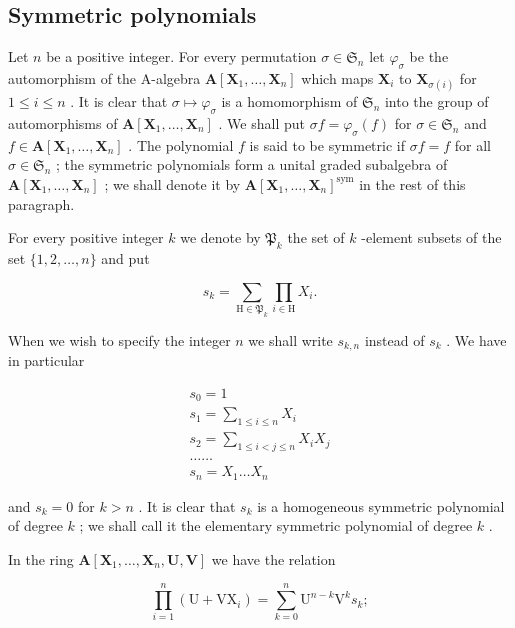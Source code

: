 \subsection{Symmetric polynomials}

Let \(n\) be a positive integer. For every permutation \(\sigma \in \mathfrak{S}_n\) let \(\varphi_{\sigma}\) be the automorphism of the A-algebra \(\mathbf{A}[\mathbf{X}_1, \ldots, \mathbf{X}_n]\) which maps \(\mathbf{X}_i\) to \(\mathbf{X}_{\sigma(i)}\) for \(1 \leqslant i \leqslant n\) . It is clear that \(\sigma \mapsto \varphi_{\sigma}\) is a homomorphism of \(\mathfrak{S}_n\) into the group of automorphisms of \(\mathbf{A}[\mathbf{X}_1, \ldots, \mathbf{X}_n]\) . We shall put \(\sigma f = \varphi_{\sigma}(f)\) for \(\sigma \in \mathfrak{S}_n\) and \(f \in \mathbf{A}[\mathbf{X}_1, \ldots, \mathbf{X}_n]\) . The polynomial \(f\) is said to be symmetric if \(\sigma f = f\) for all \(\sigma \in \mathfrak{S}_n\) ; the symmetric polynomials form a unital graded subalgebra of \(\mathbf{A}[\mathbf{X}_1, \ldots, \mathbf{X}_n]\) ; we shall denote it by \(\mathbf{A}[\mathbf{X}_1, \ldots, \mathbf{X}_n]^{\text{sym}}\) in the rest of this paragraph.

For every positive integer \(k\) we denote by \(\mathfrak{P}_k\) the set of \(k\) -element subsets of the set \(\{1, 2, \ldots, n\}\) and put

\[
s _ {k} = \sum_ {\mathrm{H} \in \mathfrak {P} _ {k}} \prod_ {i \in \mathrm{H}} X _ {i}.\tag{1}
\]

When we wish to specify the integer \(n\) we shall write \(s_{k,n}\) instead of \(s_k\) . We have in particular

\[
\begin{array}{l} s _ {0} = 1 \\ s _ {1} = \sum_ {1 \leqslant i \leqslant n} X _ {i} \\ s _ {2} = \sum_ {1 \leqslant i <   j \leqslant n} X _ {i} X _ {j} \\ \dots \dots \\ s _ {n} = X _ {1} \dots X _ {n} \end{array}
\]

and \(s_k = 0\) for \(k > n\) . It is clear that \(s_k\) is a homogeneous symmetric polynomial of degree \(k\) ; we shall call it the elementary symmetric polynomial of degree \(k\) .

In the ring \(\mathbf{A}[\mathbf{X}_1,\dots ,\mathbf{X}_n,\mathbf{U},\mathbf{V}]\) we have the relation

\[
\prod_ {i = 1} ^ {n} \left(\mathrm{U} + \mathrm{VX} _ {i}\right) = \sum_ {k = 0} ^ {n} \mathrm{U} ^ {n - k} \mathrm{V} ^ {k} s _ {k};\tag{2}
\]

